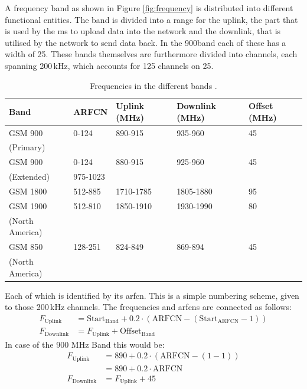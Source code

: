 A frequency band as shown in Figure \ref{fig:frequency} is distributed into different functional entities.
The band is divided into a range for the uplink, the part that is used by the \gls{ms} to upload data into the network and the downlink, that is utilised by the network to send data back.
In the 900\MHz band each of these has a width of 25\MHz.
These bands themselves are furthermore divided into channels, each spanning 200\,kHz, which accounts for 125 channels on 25\MHz.

\begin{table}
\centering
\begin{tabular}{lllll}
\toprule
Band		&ARFCN		&Uplink (MHz)	&Downlink (MHz)	&Offset (MHz)\\
\midrule
GSM 900		&0-124		&890-915		&935-960		&45\\
(Primary)	&			&				&				&\\
GSM 900		&0-124		&880-915		&925-960		&45\\
(Extended)	&975-1023	&				&				&\\
GSM 1800	&512-885	&1710-1785		&1805-1880		&95\\
GSM 1900	&512-810	&1850-1910		&1930-1990		&80\\
(North America)	&			&				&				&\\
GSM 850		&128-251	&824-849		&869-894		&45\\
(North America)	&			&				&				&\\
\bottomrule
\end{tabular}
\caption{Frequencies in the different bands \cite{kommsys2006}.}
\label{tab:frequencies}
\end{table}

Each of which is identified by its \gls{arfcn}.
This is a simple numbering scheme, given to those 200\,kHz channels.
The frequencies and \glspl{arfcn} are connected as follows:
\begin{align}
F_\text{Uplink} 	&= \text{Start}_\text{Band} + 0.2 \cdot (\text{ARFCN} -(\text{Start}_\text{ARFCN} -1))\\
F_\text{Downlink}   &= F_\text{Uplink} + \text{Offset}_\text{Band}
\end{align}
In case of the 900 MHz Band this would be:
\begin{align}
F_\text{Uplink}		&=890 + 0.2 \cdot (\text{ARFCN} - (1-1))\\
					&=890 + 0.2 \cdot \text{ARFCN}\\
F_\text{Downlink}	&=F_\text{Uplink} + 45
\end{align}

